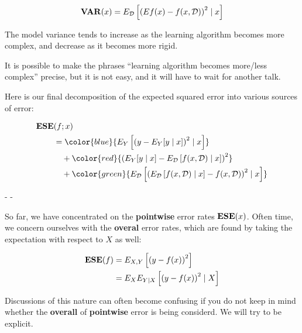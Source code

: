 %
%
\begin{frame}
  \begin{align*}
    \operatorname*{\mathbf{VAR}}(x) = E_{\operatorname*{\mathcal{D}}} \left[ \left( Ef(x) - f(x,\operatorname*{\mathcal{D}}) \right)^2 \mid x \right]
  \end{align*}

  The model variance tends to increase as the learning algorithm becomes more
  complex, and decrease as it becomes more rigid.
\end{frame}
%
%
\begin{frame}
  It is possible to make the phrases ``learning algorithm becomes more/less complex''
  precise, but it is not easy, and it will have to wait for another talk.
\end{frame}
%
%
\begin{frame}
  Here is our final decomposition of the expected squared error into various
  sources of error:

  \begin{align*}
    \ESE & (f; x) \\
    &= \color{blue}{ 
         E_Y \left[ \left( y - E_Y[y \mid x] \right)^2 \mid x \right] } \\
       & \quad + \color{red}{
         \left( E_Y[y \mid x] -  E_{\D} \left[ f(x, \D) \mid x \right] \right)^2
       } \\
       & \quad + \color{green}{
         E_{\D} \left[ \left( E_{\D} \left[ f(x, \D) \mid x \right] - 
         f(x,\D) \right)^2 \mid x \right]
       }
  \end{align*}
  \begin{center}
    \color{blue}{Irreducible Error} - \color{red}{Model Bias} - \color{green}{Model
    Variance}
  \end{center}
\end{frame}
%
%
\begin{frame}
  So far, we have concentrated on the \textbf{pointwise} error rates $\operatorname*{\mathbf{ESE}}(x)$.
  Often time, we concern ourselves with the \textbf{overal} error rates, which
  are found by taking the expectation with respect to $X$ as well:

  \begin{align*}
    \operatorname*{\mathbf{ESE}}(f) & = E_{X,Y} \left[ \left( y - f(x) \right)^2 \right] \\
    &= E_X E_{Y \mid X} \left[ \left( y - f(x) \right)^2 \mid X \right]
  \end{align*}

  Discussions of this nature can often become confusing if you do not keep in
  mind whether the \textbf{overall} of \textbf{pointwise} error is being
  considerd.  We will try to be explicit.
\end{frame}
